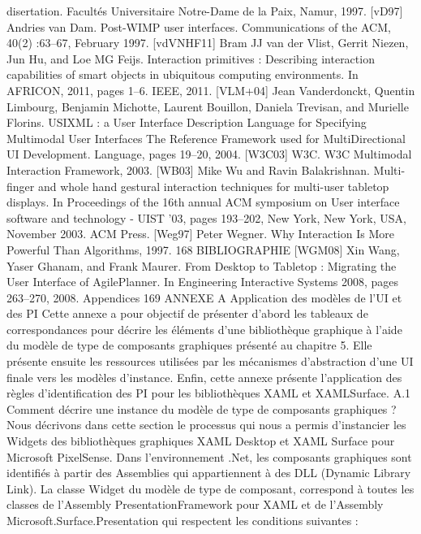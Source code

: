 \documentclass{article}
\begin{document}
disertation. Facult\'{e}s Universitaire Notre-Dame de la Paix, Namur, 1997.
[vD97]
Andries van Dam.
Post-WIMP user interfaces.
Communications of the ACM,
40(2) :63–67, February 1997.
[vdVNHF11] Bram JJ van der Vlist, Gerrit Niezen, Jun Hu, and Loe MG Feijs. Interaction primitives : Describing interaction capabilities of smart objects in ubiquitous computing
environments. In AFRICON, 2011, pages 1–6. IEEE, 2011.
[VLM+04]
Jean Vanderdonckt, Quentin Limbourg, Benjamin Michotte, Laurent Bouillon, Daniela
Trevisan, and Murielle Florins.
USIXML : a User Interface Description Language
for Specifying Multimodal User Interfaces The Reference Framework used for MultiDirectional UI Development. Language, pages 19–20, 2004.
[W3C03]
W3C. W3C Multimodal Interaction Framework, 2003.
[WB03]
Mike Wu and Ravin Balakrishnan. Multi-ﬁnger and whole hand gestural interaction
techniques for multi-user tabletop displays. In Proceedings of the 16th annual ACM
symposium on User interface software and technology - UIST ’03, pages 193–202, New
York, New York, USA, November 2003. ACM Press.
[Weg97]
Peter Wegner. Why Interaction Is More Powerful Than Algorithms, 1997.
168
BIBLIOGRAPHIE
[WGM08]
Xin Wang, Yaser Ghanam, and Frank Maurer. From Desktop to Tabletop : Migrating
the User Interface of AgilePlanner. In Engineering Interactive Systems 2008, pages
263–270, 2008.
Appendices
169
ANNEXE A
Application des mod\`{e}les de l’UI et des PI
Cette annexe a pour objectif de pr\'{e}senter d’abord les tableaux de correspondances pour d\'{e}crire les
\'{e}l\'{e}ments d’une biblioth\`{e}que graphique \`{a} l’aide du mod\`{e}le de type de composants graphiques pr\'{e}sent\'{e}
au chapitre 5. Elle pr\'{e}sente ensuite les ressources utilis\'{e}es par les m\'{e}canismes d’abstraction d’une UI
ﬁnale vers les mod\`{e}les d’instance. Enﬁn, cette annexe pr\'{e}sente l’application des r\`{e}gles d’identiﬁcation
des PI pour les biblioth\`{e}ques XAML et XAMLSurface.
A.1
Comment d\'{e}crire une instance du mod\`{e}le de type de composants
graphiques ?
Nous d\'{e}crivons dans cette section le processus qui nous a permis d’instancier les Widgets des
biblioth\`{e}ques graphiques XAML Desktop et XAML Surface pour Microsoft PixelSense. Dans l’environnement .Net, les composants graphiques sont identiﬁ\'{e}s \`{a} partir des Assemblies qui appartiennent \`{a}
des DLL (Dynamic Library Link).
La classe Widget du mod\`{e}le de type de composant, correspond \`{a} toutes les classes de l’Assembly
PresentationFramework pour XAML et de l’Assembly Microsoft.Surface.Presentation qui respectent
les conditions suivantes :
\end{document}
